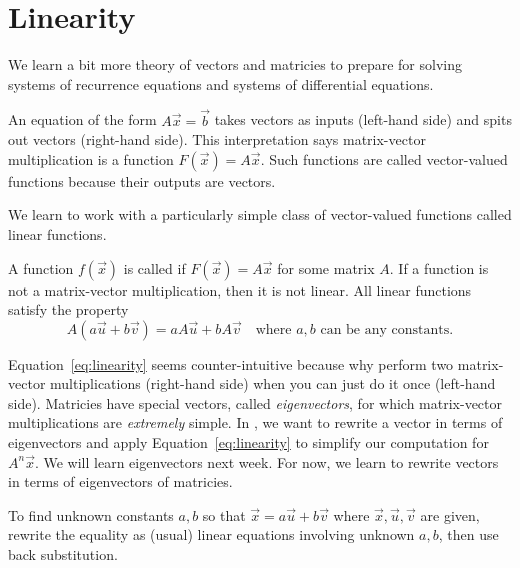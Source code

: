\documentclass[../main.tex]{subfiles}
\begin{document}
 \section{Linearity}

We learn a bit more theory of vectors and matricies to prepare for solving systems of recurrence equations and systems of differential equations.

An equation of the form \(A \vec{x} = \vec{b}\) takes vectors as inputs (left-hand side) and spits out vectors (right-hand side). This interpretation says matrix-vector multiplication is a function \(F(\vec{x}) = A \vec{x}\). Such functions are called vector-valued functions because their outputs are vectors.


We learn to work with a particularly simple class of vector-valued functions called linear functions.

\begin{definition}[linearity] \label{def:linearity}
  A function \(f(\vec{x})\) is called  if \(F(\vec{x}) = A\vec{x}\) for some matrix \(A\). If a function is not a matrix-vector multiplication, then it is not linear. All linear functions satisfy the property
  \begin{equation} \label{eq:linearity}
    A(a \vec{u} + b \vec{v}) = a A\vec{u} + b A\vec{v} \quad\text{where \(a,b\) can be any constants.}
  \end{equation}
\end{definition}

Equation~\eqref{eq:linearity} seems counter-intuitive because why perform two matrix-vector multiplications (right-hand side) when you can just do it once (left-hand side).  Matricies have special vectors, called \emph{eigenvectors}, for which matrix-vector multiplications are \emph{extremely} simple.  In \thiscourse{}, we want to rewrite a vector in terms of eigenvectors and apply Equation~\ref{eq:linearity} to simplify our computation for \(A^{n} \vec{x}\). We will learn eigenvectors next week. For now, we learn to rewrite vectors in terms of eigenvectors of matricies.

\begin{method} \label{method:linear-combination}
  To find unknown constants \(a,b\) so that \(\vec{x} = a \vec{u} + b \vec{v}\) where \(\vec{x}, \vec{u}, \vec{v}\) are given, rewrite the equality as (usual) linear equations involving unknown \(a,b\), then use back substitution.
\end{method}
\end{document}
